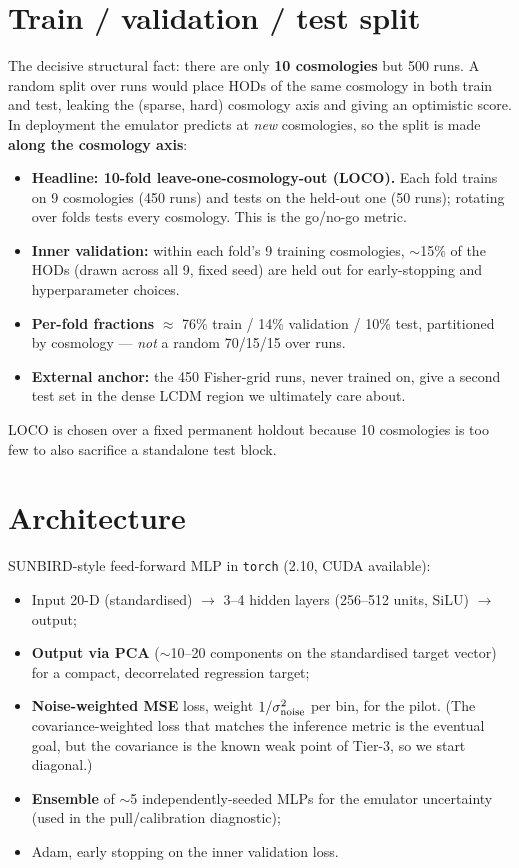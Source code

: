 \documentclass[11pt]{article}
\newcommand{\code}[1]{\texttt{#1}}
\begin{document}
\section{Train / validation / test split}
The decisive structural fact: there are only \textbf{10 cosmologies} but 500
runs. A random split over runs would place HODs of the same cosmology in both
train and test, leaking the (sparse, hard) cosmology axis and giving an
optimistic score. In deployment the emulator predicts at \emph{new}
cosmologies, so the split is made \textbf{along the cosmology axis}:
\begin{itemize}
\item \textbf{Headline: 10-fold leave-one-cosmology-out (LOCO).} Each fold trains
  on 9 cosmologies (450 runs) and tests on the held-out one (50 runs); rotating
  over folds tests every cosmology. This is the go/no-go metric.
\item \textbf{Inner validation:} within each fold's 9 training cosmologies,
  $\sim$15\% of the HODs (drawn across all 9, fixed seed) are held out for
  early-stopping and hyperparameter choices.
\item \textbf{Per-fold fractions} $\approx$ 76\% train / 14\% validation / 10\%
  test, partitioned by cosmology --- \emph{not} a random 70/15/15 over runs.
\item \textbf{External anchor:} the 450 Fisher-grid runs, never trained on, give
  a second test set in the dense LCDM region we ultimately care about.
\end{itemize}
LOCO is chosen over a fixed permanent holdout because 10 cosmologies is too few
to also sacrifice a standalone test block.

\section{Architecture}
SUNBIRD-style feed-forward MLP in \code{torch} (2.10, CUDA available):
\begin{itemize}
\item Input 20-D (standardised) $\to$ 3--4 hidden layers (256--512 units, SiLU)
  $\to$ output;
\item \textbf{Output via PCA} ($\sim$10--20 components on the standardised target
  vector) for a compact, decorrelated regression target;
\item \textbf{Noise-weighted MSE} loss, weight $1/\sigma_{\rm noise}^2$ per bin,
  for the pilot. (The covariance-weighted loss that matches the inference metric
  is the eventual goal, but the covariance is the known weak point of Tier-3, so
  we start diagonal.)
\item \textbf{Ensemble} of $\sim$5 independently-seeded MLPs for the emulator
  uncertainty (used in the pull/calibration diagnostic);
\item Adam, early stopping on the inner validation loss.
\end{itemize}
\end{document}
